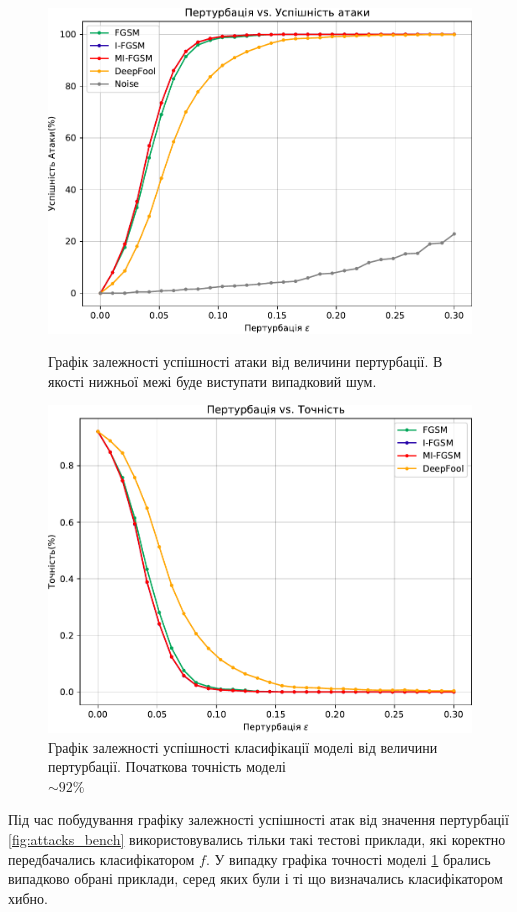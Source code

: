 \documentclass[a4paper,14pt]{extreport}
\begin{document}
	\begin{figure}[!htb]
		\includegraphics[width=1\textwidth]{resources/attacks_bench_8_6.pdf}
		\caption{Графік залежності успішності атаки від величини пертурбації. В якості нижньої межі буде виступати випадковий шум. }
		\label{fig:attacks_bench}
		\endminipage\hfill
		\includegraphics[width=1\textwidth]{resources/defenses_bench_8_6.pdf}
		\caption{Графік залежності успішності класифікації моделі від величини пертурбації. Початкова точність моделі \\ $\sim 92\%$}
		\label{fig:defenses_bench}
		\endminipage
	\end{figure}
	Під час побудування графіку залежності успішності атак від значення пертурбації \ref{fig:attacks_bench} використовувались тільки такі тестові приклади, які коректно передбачались класифікатором $f$. У випадку графіка точності моделі \ref{fig:defenses_bench} брались випадково обрані приклади, серед яких були і ті що визначались класифікатором хибно.
	
\end{document}
